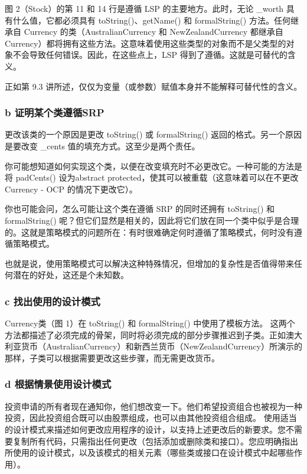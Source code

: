 图 2（Stock）的第 11 和 14 行是遵循 LSP 的主要地方。此时，无论 \_worth 具有什么值，它都必须具有 toString()、getName() 和 formalString() 方法。任何继承自 Currency 的类（AustralianCurrency 和 NewZealandCurrency 都继承自 Currency）都将拥有这些方法。这意味着使用这些类型的对象而不是父类型的对象不会导致任何错误。因此，在这些点上，LSP 得到了遵循。这就是可替代的含义。

正如第 9.3 讲所述，仅仅为变量（或参数）赋值本身并不能解释可替代性的含义。

\subsubsection{b 证明某个类遵循SRP}

更改该类的一个原因是更改 toString() 或 formalString() 返回的格式。另一个原因是要改变 \_cents 值的填充方式。这至少是两个责任。

你可能想知道如何实现这个类，以便在改变填充时不必更改它。一种可能的方法是将 padCents() 设为abstract protected，使其可以被重载（这意味着可以在不更改 Currency - OCP 的情况下更改它）。

你也可能会问，怎么可能让这个类在遵循 SRP 的同时还拥有 toString() 和 formalString() 呢？但它们显然是相关的，因此将它们放在同一个类中似乎是合理的。这就是策略模式的问题所在：有时很难确定何时遵循了策略模式，何时没有遵循策略模式。

也就是说，使用策略模式可以解决这种特殊情况，但增加的复杂性是否值得带来任何潜在的好处，这还是个未知数。

\subsubsection{c 找出使用的设计模式}

Currency类（图 1）在 toString() 和 formalString() 中使用了模板方法。
这两个方法都描述了必须完成的骨架，同时将必须完成的部分步骤推迟到子类。正如澳大利亚货币（AustralianCurrency）和新西兰货币（NewZealandCurrency）所演示的那样，子类可以根据需要更改这些步骤，而无需更改货币。

\subsubsection{d 根据情景使用设计模式}

投资申请的所有者现在通知你，他们想改变一下。他们希望投资组合也被视为一种投资，因此投资组合既可以由股票组成，也可以由其他投资组合组成。
使用适当的设计模式来描述如何更改应用程序的设计，以支持上述更改后的新要求。您不需要复制所有代码，只需指出任何更改（包括添加或删除类和接口）。您应明确指出所使用的设计模式，以及该模式的相关元素（哪些类或接口在设计模式中起哪些作用）。

